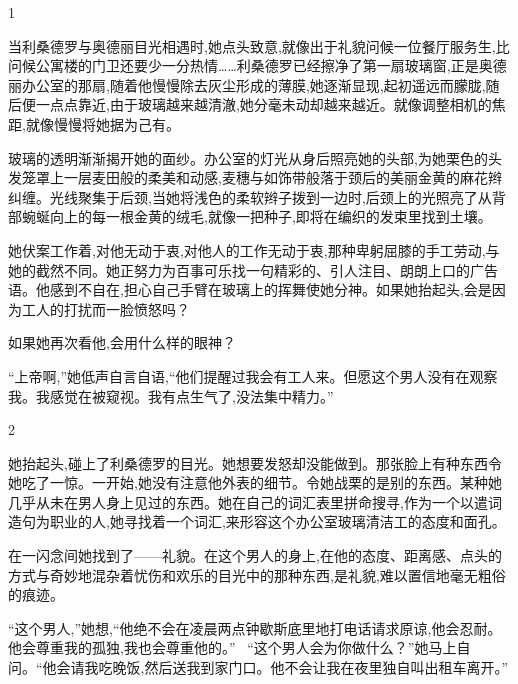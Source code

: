 \documentclass{ctexart}
\renewcommand{\\}{\par}
\begin{document}
\\ \begin{center} 1 \end{center} \\当利桑德罗与奥德丽目光相遇时,她点头致意,就像出于礼貌问候一位餐厅服务生,比问候公寓楼的门卫还要少一分热情……利桑德罗已经擦净了第一扇玻璃窗,正是奥德丽办公室的那扇,随着他慢慢除去灰尘形成的薄膜,她逐渐显现,起初遥远而朦胧,随后便一点点靠近,由于玻璃越来越清澈,她分毫未动却越来越近。就像调整相机的焦距,就像慢慢将她据为己有。\\玻璃的透明渐渐揭开她的面纱。办公室的灯光从身后照亮她的头部,为她栗色的头发笼罩上一层麦田般的柔美和动感,麦穗与如饰带般落于颈后的美丽金黄的麻花辫纠缠。光线聚集于后颈,当她将浅色的柔软辫子拨到一边时,后颈上的光照亮了从背部蜿蜒向上的每一根金黄的绒毛,就像一把种子,即将在编织的发束里找到土壤。 \\她伏案工作着,对他无动于衷,对他人的工作无动于衷,那种卑躬屈膝的手工劳动,与她的截然不同。她正努力为百事可乐找一句精彩的、引人注目、朗朗上口的广告语。他感到不自在,担心自己手臂在玻璃上的挥舞使她分神。如果她抬起头,会是因为工人的打扰而一脸愤怒吗？ \\如果她再次看他,会用什么样的眼神？ \\``上帝啊,''她低声自言自语,``他们提醒过我会有工人来。但愿这个男人没有在观察我。我感觉在被窥视。我有点生气了,没法集中精力。'' \\ \begin{center} 2 \end{center} \\她抬起头,碰上了利桑德罗的目光。她想要发怒却没能做到。那张脸上有种东西令她吃了一惊。一开始,她没有注意他外表的细节。令她战栗的是别的东西。某种她几乎从未在男人身上见过的东西。她在自己的词汇表里拼命搜寻,作为一个以遣词造句为职业的人,她寻找着一个词汇,来形容这个办公室玻璃清洁工的态度和面孔。\\在一闪念间她找到了——礼貌。在这个男人的身上,在他的态度、距离感、点头的方式与奇妙地混杂着忧伤和欢乐的目光中的那种东西,是礼貌,难以置信地毫无粗俗的痕迹。 \\“这个男人,”她想,“他绝不会在凌晨两点钟歇斯底里地打电话请求原谅,他会忍耐。他会尊重我的孤独,我也会尊重他的。” \ “这个男人会为你做什么？”她马上自问。“他会请我吃晚饭,然后送我到家门口。他不会让我在夜里独自叫出租车离开。” 
\end{document}
